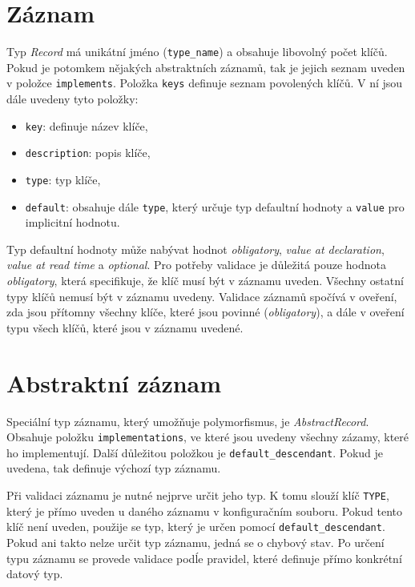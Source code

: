 \documentclass[FM,MP]{tulthesis}
\begin{document}
	\section{Záznam}
		\label{struktura-zaznam}
		Typ \textit{Record} má unikátní jméno (\texttt{type\_name}) a obsahuje libovolný počet klíčů. Pokud je potomkem nějakých abstraktních záznamů, tak je jejich seznam uveden v položce \texttt{implements}. Položka \texttt{keys} definuje seznam povolených klíčů. V ní jsou dále uvedeny tyto položky:
		\begin{itemize}
			\item \texttt{key}: definuje název klíče,
			\item \texttt{description}: popis klíče,
			\item \texttt{type}: typ klíče,
			\item \texttt{default}: obsahuje dále \texttt{type}, který určuje typ defaultní hodnoty a \texttt{value} pro implicitní hodnotu.
		\end{itemize}

		Typ defaultní hodnoty může nabývat hodnot \textit{obligatory}, \textit{value at declaration}, \textit{value at read time} a \textit{optional}. Pro potřeby validace je důležitá pouze hodnota \textit{obligatory}, která specifikuje, že klíč musí být v záznamu uveden. Všechny ostatní typy klíčů nemusí být v záznamu uvedeny. Validace záznamů spočívá v oveření, zda jsou přítomny všechny klíče, které jsou povinné (\textit{obligatory}), a dále v oveření typu všech klíčů, které jsou v záznamu uvedené.

	\section{Abstraktní záznam}
		Speciální typ záznamu, který umožňuje polymorfismus, je \textit{AbstractRecord}. Obsahuje položku \texttt{implementations}, ve které jsou uvedeny všechny zázamy, které ho implementují. Další důležitou položkou je \texttt{default\_descendant}. Pokud je uvedena, tak definuje výchozí typ záznamu.

		Při validaci záznamu je nutné nejprve určit jeho typ. K tomu slouží klíč \texttt{TYPE}, který je přímo uveden u daného záznamu v konfiguračním souboru. Pokud tento klíč není uveden, použije se typ, který je určen pomocí \texttt{default\_descendant}. Pokud ani takto nelze určit typ záznamu, jedná se o chybový stav. Po určení typu záznamu se provede validace podĺe pravidel, které definuje přímo konkrétní datový typ. 
\end{document}
